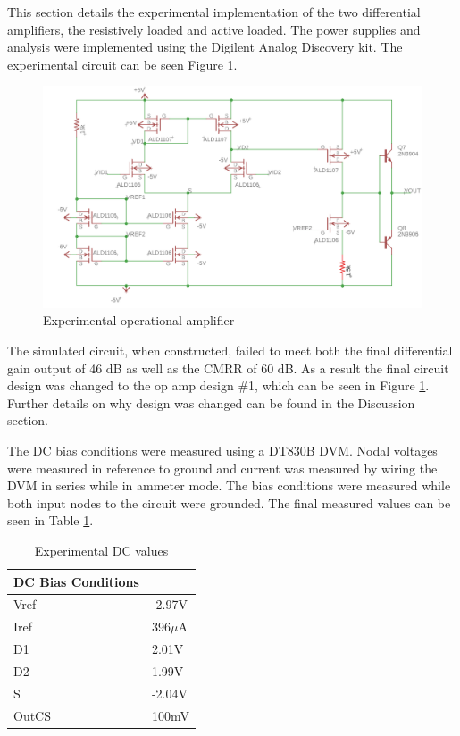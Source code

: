 




This section details the experimental implementation of the two differential amplifiers, the resistively loaded and active loaded. The power supplies and analysis were implemented using the Digilent Analog Discovery kit. The experimental circuit can be seen Figure \ref{fig:expercircuit}.

\begin{figure}[H]
	\begin{center}
		\includegraphics[scale=.40]{ExperimentalImplementation/final_schem.png}
		\caption{Experimental operational amplifier}
		\label{fig:expercircuit}
	\end{center}
\end{figure}
The simulated circuit, when constructed, failed to meet both the final differential gain output of 46 dB as well as the CMRR of 60 dB. As a result the final circuit design was changed to the op amp design \#1, which can be seen in Figure \ref{fig:expercircuit}. Further details on why design was changed can be found in the Discussion section.

The DC bias conditions were measured using a DT830B DVM. Nodal voltages were measured in reference to ground and current was measured by wiring the DVM in series while in ammeter mode. The bias conditions were measured while both input nodes to the circuit were grounded. The final measured values can be seen in Table \ref{tab:expdc}.


\begin{table}[H]
	\centering
	\caption{Experimental DC values}
	\label{tab:expdc}
	\begin{tabular}{|l|l|}
		\hline
		\textbf{DC Bias Conditions} &           \\ \hline
		Vref                        & -2.97V    \\ \hline
		Iref                        & 396$\mu$A \\ \hline
		D1                          & 2.01V     \\ \hline
		D2                          & 1.99V     \\ \hline
		S                           & -2.04V    \\ \hline
		OutCS                       & 100mV      \\ \hline
	\end{tabular}
\end{table}

